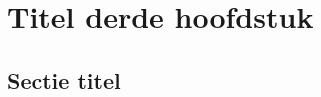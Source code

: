 \chapter{Titel derde hoofdstuk}
\label{chap:evaluation}

\lipsum[9-10]

\section{Sectie titel}
\label{sec:scalable_faafo}

\lipsum[10-12]
